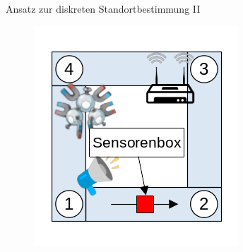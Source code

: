\documentclass[10pt]{beamer}
\begin{document}
\begin{frame}{Ansatz zur diskreten Standortbestimmung II}
    \begin{figure}
        \centering
        \includegraphics[width=0.6\linewidth]{model/grundlegender_ansatz_2.png}
    \end{figure}
\end{frame}
\end{document}
